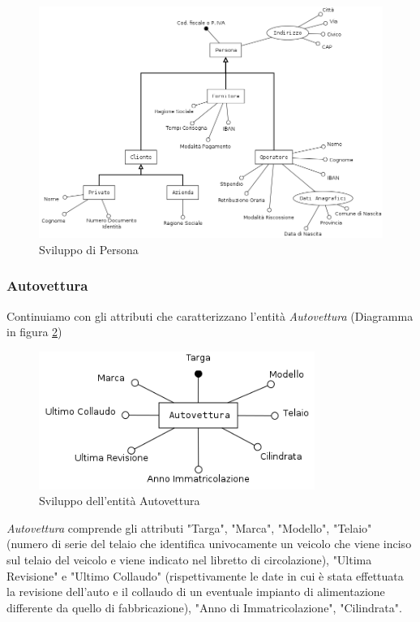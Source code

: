 			\begin{figure}[H]
				\centering
				\includegraphics[width=12cm]{images/finitures/persona.png}
				\caption{Sviluppo di Persona}
				\label{fig:persona}
			\end{figure}
		
		\subsubsection{Autovettura}
			
			Continuiamo con gli attributi che caratterizzano l'entità \emph{Autovettura} (Diagramma in figura \ref{fig:autovettura})
			
			\begin{figure}[H]
				\centering
				\includegraphics[width=9cm]{images/finitures/autovettura.png}
				\caption{Sviluppo dell'entità Autovettura}
				\label{fig:autovettura}
			\end{figure}
			
			\emph{Autovettura} comprende gli attributi "Targa", "Marca", "Modello", "Telaio" (numero di serie del telaio che identifica univocamente un veicolo che viene inciso sul telaio del veicolo e viene indicato nel libretto di circolazione), "Ultima Revisione" e "Ultimo Collaudo" (rispettivamente le date in cui è stata effettuata la revisione dell'auto e il collaudo di un eventuale impianto di alimentazione differente da quello di fabbricazione), "Anno di Immatricolazione", "Cilindrata".
		
